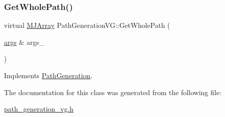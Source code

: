 \subsubsection{\texorpdfstring{Get\+Whole\+Path()}{GetWholePath()}}
{\footnotesize\ttfamily virtual \hyperlink{classMJArray}{M\+J\+Array} Path\+Generation\+V\+G\+::\+Get\+Whole\+Path (\begin{DoxyParamCaption}\item[{\hyperlink{path__generation_8h_a75c13cde2074f502cc4348c70528572d}{args} \&}]{args\+\_\+ }\end{DoxyParamCaption})\hspace{0.3cm}{\ttfamily [virtual]}}



Implements \hyperlink{classPathGeneration_ace7520fed7b6a7711f4d3684c974cb76}{Path\+Generation}.



The documentation for this class was generated from the following file\+:\begin{DoxyCompactItemize}
\item 
\hyperlink{path__generation__vg_8h}{path\+\_\+generation\+\_\+vg.\+h}\end{DoxyCompactItemize}
